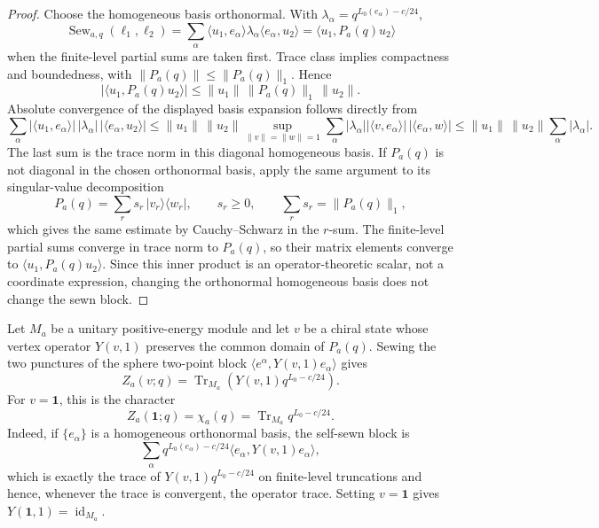 \begin{proof}
Choose the homogeneous basis orthonormal.  With
\(\lambda_\alpha=q^{L_0(e_\alpha)-c/24}\),
\[
  \operatorname{Sew}_{a,q}(\ell_1,\ell_2)
  =
  \sum_\alpha
  \langle u_1,e_\alpha\rangle\lambda_\alpha
  \langle e_\alpha,u_2\rangle
  =
  \langle u_1,P_a(q)u_2\rangle
\]
when the finite-level partial sums are taken first.  Trace class implies
compactness and boundedness, with
\(\|P_a(q)\|\le\|P_a(q)\|_1\).  Hence
\[
  |\langle u_1,P_a(q)u_2\rangle|
  \le
  \|u_1\|\,\|P_a(q)\|_1\,\|u_2\|.
\]
Absolute convergence of the displayed basis expansion follows directly from
\[
  \sum_\alpha
  |\langle u_1,e_\alpha\rangle|\,|\lambda_\alpha|\,
  |\langle e_\alpha,u_2\rangle|
  \le
  \|u_1\|\,\|u_2\|
  \sup_{\|v\|=\|w\|=1}
  \sum_\alpha |\lambda_\alpha|
  |\langle v,e_\alpha\rangle|\,|\langle e_\alpha,w\rangle|
  \le
  \|u_1\|\,\|u_2\|\sum_\alpha|\lambda_\alpha|.
\]
The last sum is the trace norm in this diagonal homogeneous basis.  If
\(P_a(q)\) is not diagonal in the chosen orthonormal basis, apply the same
argument to its singular-value decomposition
\[
  P_a(q)=\sum_r s_r\,|v_r\rangle\langle w_r|,
  \qquad
  s_r\ge0,\qquad
  \sum_r s_r=\|P_a(q)\|_1,
\]
which gives the same estimate by Cauchy--Schwarz in the \(r\)-sum.  The
finite-level partial sums converge in trace norm to \(P_a(q)\), so their
matrix elements converge to \(\langle u_1,P_a(q)u_2\rangle\).  Since this
inner product is an operator-theoretic scalar, not a coordinate expression,
changing the orthonormal homogeneous basis does not change the sewn block.
\end{proof}

\begin{remark}
\label{rem:torus-trace-from-self-sewing}
Let \(M_a\) be a unitary positive-energy module and let \(v\) be a chiral
state whose vertex operator \(Y(v,1)\) preserves the common domain of
\(P_a(q)\).  Sewing the two punctures of the sphere two-point block
\(\langle e^\alpha,Y(v,1)e_\alpha\rangle\) gives
\begin{equation}
  Z_a(v;q)
  =
  \operatorname{Tr}_{M_a}
  \left(
    Y(v,1)q^{L_0-c/24}
  \right).
  \label{eq:torus-one-point-trace-from-sewing}
\end{equation}
For \(v=\mathbf 1\), this is the character
\begin{equation}
  Z_a(\mathbf 1;q)=\chi_a(q)
  =
  \operatorname{Tr}_{M_a}q^{L_0-c/24}.
  \label{eq:character-from-self-sewing}
\end{equation}
Indeed, if \(\{e_\alpha\}\) is a homogeneous orthonormal basis, the self-sewn
block is
\[
  \sum_\alpha
  q^{L_0(e_\alpha)-c/24}
  \langle e_\alpha,Y(v,1)e_\alpha\rangle,
\]
which is exactly the trace of
\(Y(v,1)q^{L_0-c/24}\) on finite-level truncations and hence, whenever the
trace is convergent, the operator trace.  Setting \(v=\mathbf 1\) gives
\(Y(\mathbf 1,1)=\operatorname{id}_{M_a}\).
\end{remark}

